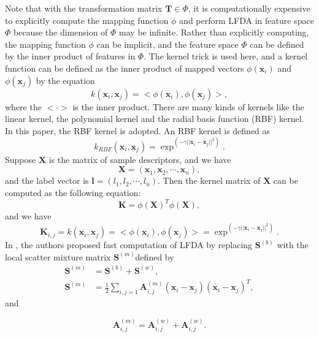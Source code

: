 Note that with the transformation matrix $\bm{T} \in \Phi$, it is computationally expensive to explicitly compute the mapping function $\phi$ and perform LFDA in feature space $\Phi$ because the dimension of $\Phi$ may be infinite. Rather than explicitly computing, the mapping function $\phi$ can be implicit, and the feature space $\Phi$ can be defined by the inner product of features in $\Phi$. The kernel trick is used here, and a kernel function can be defined as the inner product of mapped vectors $\phi(\bm{x}_i)$ and $\phi(\bm{x}_j)$ by the equation
 \begin{equation}
 k(\bm{x}_i,\bm{x}_j) = <\phi(\bm{x}_i),\phi(\bm{x}_j)>,
 \end{equation}
where the $< \cdot >$ is the inner product. There are many kinds of kernels like the linear kernel, the polynomial kernel and the radial basis function (RBF) kernel. In this paper, the RBF kernel is adopted. An RBF kernel is defined as 
 \begin{equation}
 k_{RBF}(\bm{x}_i,\bm{x}_j) = \exp^{(-\gamma||\bm{x}_i-\bm{x}_j||^2)}. 
 \end{equation}
Suppose $\bm{X}$ is the matrix of sample descriptors, and we have
\begin{equation}
\bm{X} = (\bm{x}_1, \bm{x}_2,\cdots, \bm{x}_n), 
\end{equation}
and the label vector is $\bm{l} = (l_1, l_2, \cdots, l_n)$. Then the kernel matrix of $\bm{X}$ can be computed as the following equation:
\begin{equation}
\bm{K} =  \phi(\bm{X})^T \phi(\bm{X}),
\end{equation}
and we have 
\begin{equation}
\bm{K}_{i,j} =  k(\bm{x}_i,\bm{x}_j) = <\phi(\bm{x}_i),\phi(\bm{x}_j)> =  \exp^{(-\gamma||\bm{x}_i-\bm{x}_j||^2)}.
\end{equation}
In \cite{KLFDA}, the authors proposed fast computation of LFDA by replacing $\bm{S}^{(b)}$ with the local scatter mixture matrix $\bm{S}^{(m)}$defined by 
\begin{equation}
\begin{aligned}
\bm{S}^{(m)} &= \bm{S}^{(b)} + \bm{S}^{(w)},\\
\bm{S}^{(m)} &= \frac{1}{2} \sum_{i,j = 1} \bm{A}_{i,j}^{(m)} (\bm{x}_i - \bm{x}_j)(\bm{x}_i - \bm{x}_j)^T,
\end{aligned}
\end{equation}
and 

\begin{equation}
\bm{A}_{i,j}^{(m)} = \bm{A}_{i,j}^{(w)}  + \bm{A}_{i,j}^{(w)}.
\end{equation}

